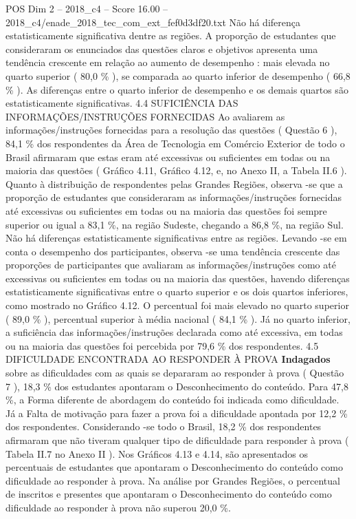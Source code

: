 \begin{textsample}{POS Dim 2 – 2018\_c4 – Score 16.00 – 2018\_c4/enade\_2018\_tec\_com\_ext\_fef0d3df20.txt}
Não há diferença estatisticamente significativa dentre as regiões.
A proporção de estudantes que consideraram os enunciados das questões claros e objetivos apresenta uma tendência crescente em relação ao aumento de desempenho : mais elevada no quarto superior ( 80,0 \% ), se comparada ao quarto inferior de desempenho ( 66,8 \% ).
As diferenças entre o quarto inferior de desempenho e os demais quartos são estatisticamente significativas. 4.4 SUFICIÊNCIA DAS INFORMAÇÕES/INSTRUÇÕES FORNECIDAS Ao avaliarem as informações/instruções fornecidas para a resolução das questões ( Questão 6 ), 84,1 \% dos respondentes da Área de Tecnologia em Comércio Exterior de todo o Brasil afirmaram que estas eram até excessivas ou suficientes em todas ou na maioria das questões ( Gráfico 4.11, Gráfico 4.12, e, no Anexo II, a Tabela II.6 ).
Quanto à distribuição de respondentes pelas Grandes Regiões, observa -se que a proporção de estudantes que consideraram as informações/instruções fornecidas até excessivas ou suficientes em todas ou na maioria das questões foi sempre superior ou igual a 83,1 \%, na região Sudeste, chegando a 86,8 \%, na região Sul.
Não há diferenças estatisticamente significativas entre as regiões.
Levando -se em conta o desempenho dos participantes, observa -se uma tendência crescente das proporções de participantes que avaliaram as informações/instruções como até excessivas ou suficientes em todas ou na maioria das questões, havendo diferenças estatisticamente significativas entre o quarto superior e os dois quartos inferiores, como mostrado no Gráfico 4.12.
O percentual foi mais elevado no quarto superior ( 89,0 \% ), percentual superior à média nacional ( 84,1 \% ).
Já no quarto inferior, a suficiência das informações/instruções declarada como até excessiva, em todas ou na maioria das questões foi percebida por 79,6 \% dos respondentes. 4.5 DIFICULDADE ENCONTRADA AO RESPONDER À PROVA \textbf{Indagados} sobre as dificuldades com as quais se depararam ao responder à prova ( Questão 7 ), 18,3 \% dos estudantes apontaram o Desconhecimento do conteúdo.
Para 47,8 \%, a Forma diferente de abordagem do conteúdo foi indicada como dificuldade.
Já a Falta de motivação para fazer a prova foi a dificuldade apontada por 12,2 \% dos respondentes.
Considerando -se todo o Brasil, 18,2 \% dos respondentes afirmaram que não tiveram qualquer tipo de dificuldade para responder à prova ( Tabela II.7 no Anexo II ).
Nos Gráficos 4.13 e 4.14, são apresentados os percentuais de estudantes que apontaram o Desconhecimento do conteúdo como dificuldade ao responder à prova.
Na análise por Grandes Regiões, o percentual de inscritos e presentes que apontaram o Desconhecimento do conteúdo como dificuldade ao responder à prova não superou 20,0 \%.

\end{textsample}
